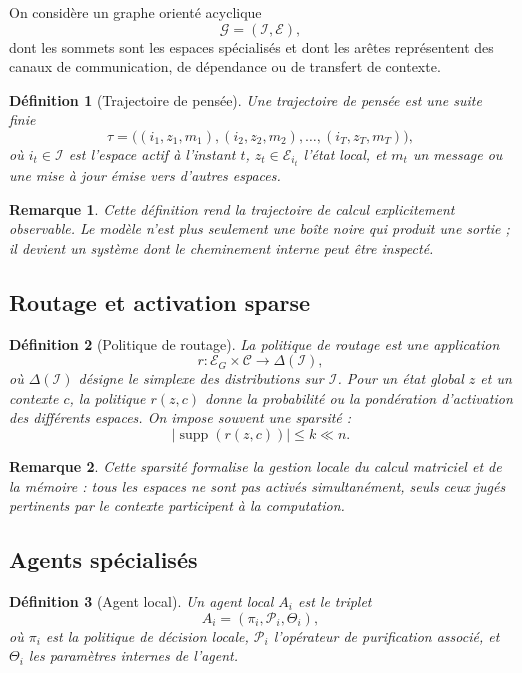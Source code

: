 \documentclass[11pt,a4paper]{article}
\newtheorem{definition}{Définition}[section]
\newtheorem{remark}{Remarque}[section]
\DeclareMathOperator{\supp}{supp}
\newcommand{\C}{\mathcal C}
\newcommand{\E}{\mathcal E}
\newcommand{\I}{\mathcal I}
\newcommand{\Pcal}{\mathcal P}
\newcommand{\Gcal}{\mathcal G}
\newcommand{\1}{\mathbf 1}
\begin{document}
On considère un graphe orienté acyclique
\[
\Gcal=(\I,\mathcal E),
\]
dont les sommets sont les espaces spécialisés et dont les arêtes représentent des canaux de communication, de dépendance ou de transfert de contexte.

\begin{definition}[Trajectoire de pensée]
Une trajectoire de pensée est une suite finie
\[
\tau
=
\bigl((i_1,z_1,m_1),(i_2,z_2,m_2),\dots,(i_T,z_T,m_T)\bigr),
\]
où \(i_t\in\I\) est l'espace actif à l'instant \(t\), \(z_t\in\E_{i_t}\) l'état local, et \(m_t\) un message ou une mise à jour émise vers d'autres espaces.
\end{definition}

\begin{remark}
Cette définition rend la trajectoire de calcul explicitement observable. Le modèle n'est plus seulement une boîte noire qui produit une sortie ; il devient un système dont le cheminement interne peut être inspecté.
\end{remark}

\subsection{Routage et activation sparse}

\begin{definition}[Politique de routage]
La politique de routage est une application
\[
r:\E_G\times\C\to\Delta(\I),
\]
où \(\Delta(\I)\) désigne le simplexe des distributions sur \(\I\).
Pour un état global \(z\) et un contexte \(c\), la politique \(r(z,c)\) donne la probabilité ou la pondération d'activation des différents espaces.
On impose souvent une sparsité :
\[
|\supp(r(z,c))|\le k\ll n.
\]
\end{definition}

\begin{remark}
Cette sparsité formalise la gestion locale du calcul matriciel et de la mémoire : tous les espaces ne sont pas activés simultanément, seuls ceux jugés pertinents par le contexte participent à la computation.
\end{remark}

\subsection{Agents spécialisés}

\begin{definition}[Agent local]
Un agent local \(A_i\) est le triplet
\[
A_i=(\pi_i,\Pcal_i,\Theta_i),
\]
où \(\pi_i\) est la politique de décision locale, \(\Pcal_i\) l'opérateur de purification associé, et \(\Theta_i\) les paramètres internes de l'agent.
\end{definition}
\end{document}
